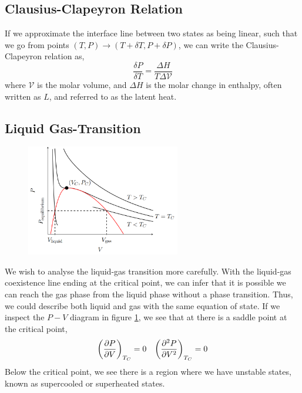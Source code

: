 \documentclass{book}
\begin{document}
\subsection{Clausius-Clapeyron Relation}
If we approximate the interface line between two states as being linear, such that we go from points $(T,P) \to (T+\delta T, P + \delta P)$, we can write the Clausius-Clapeyron relation as,
\begin{equation}
	\frac{\delta P}{\delta T} = \frac{\Delta H}{T \Delta\mathcal{V}}
\end{equation}
where $\mathcal{V}$ is the molar volume, and $\Delta H$ is the molar change in enthalpy, often written as $L$, and referred to as the latent heat.
\subsection{Liquid Gas-Transition}
\begin{figure}
	\centering
	\includegraphics[width=0.6\textwidth]{pv phase.png}
	\caption{}
	\label{fig:pv phase}
\end{figure}
We wish to analyse the liquid-gas transition more carefully. With the liquid-gas coexistence line ending at the critical point, we can infer that it is possible we can reach the gas phase from the liquid phase without a phase transition. Thus, we could describe both liquid and gas with the same equation of state. If we inspect the $P-V$ diagram in figure \ref{fig:pv phase}, we see that at there is a saddle point at the critical point,
\begin{align}
	\left(\pdv{P}{V}\right)_{T_C} = 0 && \left(\pdv[2]{P}{V}\right)_{T_C} = 0 \label{eq:fkjhdsklaj}
\end{align}
Below the critical point, we see there is a region where we have unstable states, known as supercooled or superheated states.
\end{document}
